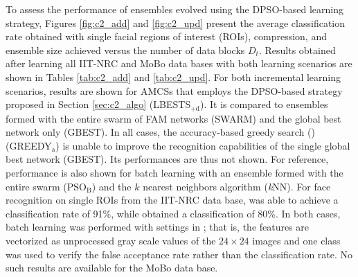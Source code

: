 To assess the performance of ensembles evolved using the DPSO-based learning strategy, Figures \ref{fig:c2_add} and \ref{fig:c2_upd} present the average classification rate obtained with single facial regions of interest (ROIs), compression, and ensemble size achieved versus the number of data blocks $D_t$.
Results obtained after learning all IIT-NRC and MoBo data bases with both learning scenarios are shown in Tables \ref{tab:c2_add} and \ref{tab:c2_upd}.
For both incremental learning scenarios, results are shown for AMCSs that employs the DPSO-based strategy proposed in Section \ref{sec:c2_algo} (LBESTS$_\text{+d}$).
It is compared to ensembles formed with the entire swarm of FAM networks (SWARM) and the global best network only (GBEST).
In all cases, the accuracy-based greedy search (\cite{ulas09}) (GREEDY$_\text{a}$) is unable to improve the recognition capabilities of the single global best network (GBEST).
Its performances are thus not shown.  
For reference, performance is also shown for batch learning with an ensemble formed with the entire swarm (PSO$_\text{B}$) and the $k$ nearest neighbors algorithm (\textit{k}NN).
For face recognition on single ROIs from the IIT-NRC data base, \cite{arandjelovic09} was able to achieve a classification rate of 91\%, while \cite{gorodnichy05} obtained a classification of 80\%.
In both cases, batch learning was performed with settings in \cite{gorodnichy05}; that is, the features are vectorized as unprocessed gray scale values of the $24 \times 24$ images and one class was used to verify the false acceptance rate rather than the classification rate.
No such results are available for the MoBo data base.


\begin{figure*}[t]
  \centering
	\caption{Average classification rate, compression, and ensemble size of the AMCS versus blocks of IIT-NRC data learned during the enrollment scenario.
Performance was evaluated during incremental learning for the AMCS with different ensemble selection techniques and the global best network alone (GBEST).
The performance of the whole swarm optimized during batch learning (PSO$_\text{B}$) and \textit{k}NN are shown for reference.
Error bars correspond to the 90\% confidence interval}
	\label{fig:c2_add}
\end{figure*}


